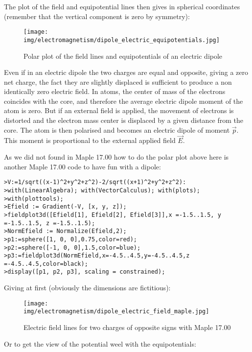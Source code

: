 	The plot of the field and equipotential lines then gives in spherical coordinates (remember that the vertical component is zero by symmetry):
	\begin{figure}[H]
		\centering
		\texttt{[image: img/electromagnetism/dipole\_electric\_equipotentials.jpg]}
		\caption{Polar plot of the field lines and equipotentials of an electric dipole}
	\end{figure}
	Even if in an electric dipole the two charges are equal and opposite, giving a zero net charge, the fact they are slightly displaced is sufficient to produce a non identically zero electric field. In atoms, the center of mass of the electrons coincides with the core, and therefore the average electric dipole moment of the atom is zero. But if an external field is applied, the movement of electrons is distorted and the electron mass center is displaced by a given distance from the core. The atom is then polarised and becomes an electric dipole of moment $\vec{p}$. This moment is proportional to the external applied field $\vec{E}$.

	As we did not found in Maple 17.00 how to do the polar plot above here is another Maple 17.00  code to have fun with a dipole:
	
	\texttt{>V:=1/sqrt((x-1)\string^2+y\string^2+z\string^2)-2/sqrt((x+1)\string^2+y\string^2+z\string^2):\\
	>with(LinearAlgebra); with(VectorCalculus); with(plots);\\
	>with(plottools);\\
	>Efield := Gradient(-V, [x, y, z]);\\
	>fieldplot3d([Efield[1], Efield[2], Efield[3]],x =-1.5..1.5, y =-1.5..1.5, z =-1.5..1.5);\\
	>NormEfield := Normalize(Efield,2);\\
	>p1:=sphere([1, 0, 0],0.75,color=red);\\
	>p2:=sphere([-1, 0, 0],1.5,color=blue);\\
	>p3:=fieldplot3d(NormEfield,x=-4.5..4.5,y=-4.5..4.5,z =-4.5..4.5,color=black);\\
	>display([p1, p2, p3], scaling = constrained);
	}

	Giving at first (obviously the dimensions are fictitious):
	\begin{figure}[H]
		\centering
		\texttt{[image: img/electromagnetism/dipole\_electric\_field\_maple.jpg]}
		\caption{Electric field lines for two charges of opposite signs with Maple 17.00}
	\end{figure}
	Or to get the view of the potential weel with the equipotentials:

